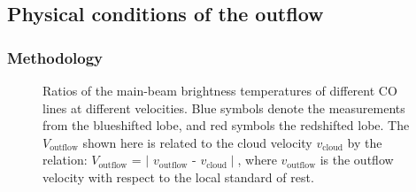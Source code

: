 \subsection{Physical conditions of the outflow}
\subsubsection{Methodology}

\begin{figure}[tbp]
\caption{Ratios of the main-beam brightness temperatures of different CO lines at different velocities. Blue symbols denote the measurements from the blueshifted lobe, and red symbols the redshifted lobe. The $V_{\mathrm{outflow}}$ shown here is related to the cloud velocity $v_{\mathrm{cloud}}$ by the relation: $V_{\mathrm{outflow}}$ = $\mid$ $v_{\mathrm{outflow}}$ - $v_{\mathrm{cloud}}\mid$, where $v_{\mathrm{outflow}}$ is the outflow velocity with respect to the local standard of rest. \label{fig:figratio}}
\end{figure}

